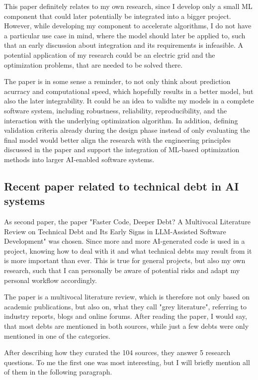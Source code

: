 \documentclass[11pt]{article}
\begin{document}
This paper definitely relates to my own research, since I develop only a small ML component that could later potentially be integrated into a bigger project. However, while developing my component to accelerate algorithms, I do not have a particular use case in mind, where the model should later be applied to, such that an early discussion about integration and its requirements is infeasible. A potential application of my research could be an electric grid and the optimization problems, that are needed to be solved there.

The paper is in some sense a reminder, to not only think about prediction acurracy and computational speed, which hopefully results in a better model, but also the later integrability. 
It could be an idea to validte my models in a complete software system, including robustness, reliability, reproducibility, and the interaction with the underlying optimization algorithm. In addition, defining validation criteria already during the design phase instead of only evaluating the final model would better align the research with the engineering principles discussed in the paper and support the integration of ML-based optimization methods into larger AI-enabled software systems.

\subsection{Recent paper related to technical debt in AI systems} \label{ch:debt_paper}

As second paper, the paper "Faster Code, Deeper Debt? A Multivocal Literature Review on Technical Debt and Its Early Signs in LLM-Assisted Software Development"  \citep{Ehsani2026Faster} was chosen. Since more and more AI-generated code is used in a project, knowing how to deal with it and what technical debts may result from it is more important than ever. This is true for general projects, but also my own research, such that I can personally be aware of potential risks and adapt my personal workflow accordingly.

The paper is a multivocal literature review, which is therefore not only based on academic publications, but also on, what they call "grey literature", referring to industry reports, blogs and online forums. After reading the paper, I would say, that most debts are mentioned in both sources, while just a few debts were only mentioned in one of the categories. 

After describing how they curated the 104 sources, they answer 5 research questions. To me the first one was most interesting, but I will briefly mention all of them in the following paragraph.
\end{document}

